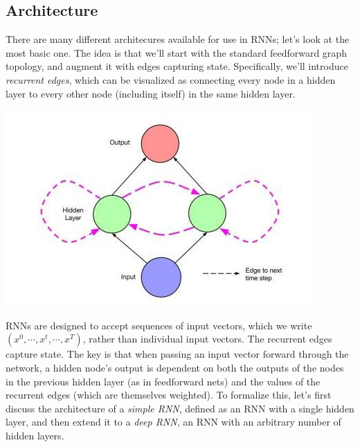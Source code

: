 \documentclass{article}
\begin{document}
\subsection{Architecture}
There are many different architecures available for use in RNNs; let's look at the most basic one. The idea is that we'll start with the standard feedforward graph topology, and augment it with edges capturing state. Specifically, we'll introduce \textit{recurrent edges}, which can be visualized as connecting every node in a hidden layer to every other node (including itself) in the same hidden layer.

\begin{center}
    \includegraphics[scale=0.7]{images/rnn.png}
\end{center}

RNNs are designed to accept sequences of input vectors, which we write $ ( x^0, \cdots, x^t, \cdots, x^T ) $, rather than individual input vectors. The recurrent edges capture state. The key is that when passing an input vector forward through the network, a hidden node's output is dependent on both the outputs of the nodes in the previous hidden layer (as in feedforward nets) and the values of the recurrent edges (which are themselves weighted). To formalize this, let's first discuss the architecture of a \textit{simple RNN}, defined as an RNN with a single hidden layer, and then extend it to a \textit{deep RNN}, an RNN with an arbitrary number of hidden layers.
\end{document}
